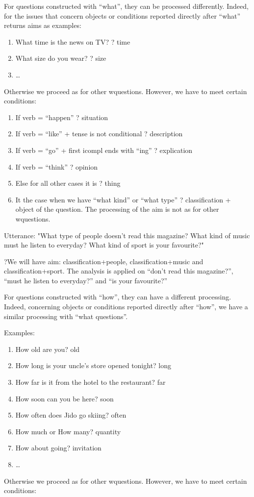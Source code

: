 \documentclass[twoside,a4paper,10pt]{report}
\newcommand{\dokuitem}{\item}
\begin{document}
For questions constructed with “what”, they can be processed differently. Indeed, for the issues that concern objects or conditions reported directly after “what” returns aims as examples:


\begin{enumerate}\dokuitem  What time is the news on TV? ? time
\dokuitem  What size do you wear? ? size
\dokuitem  \ldots{}
\end{enumerate}

Otherwise we proceed as for other w{\textunderscore}questions. However, we have to meet certain conditions:


\begin{enumerate}\dokuitem  If verb = “happen” ? situation
\dokuitem  If verb = “like” + tense is not conditional ? description
\dokuitem  If verb = “go” + first i{\textunderscore}compl ends with “ing” ? explication
\dokuitem  If verb = “think” ? opinion
\dokuitem  Else for all other cases it is ? thing
\dokuitem  It the case when we have “what kind” or “what type” ? classification + object of the question. The processing of the aim is not as for other w{\textunderscore}questions.
\end{enumerate}

Utterance: "What type of people doesn’t read this magazine? What kind of music must he listen to everyday? What kind of sport is your favourite?"



\small
\begin{verbatimtab}
  ?We will have aim: classification+people, classification+music and classification+sport. The
analysis is applied on “don't read this magazine?”, “must he listen to everyday?” and “is
your favourite?”
\end{verbatimtab}
\normalsize
For questions constructed with “how”, they can have a different processing. Indeed, concerning objects or conditions reported directly after “how”, we have a similar processing with “what questions”. 

Examples:


\begin{enumerate}\dokuitem  How old are you? old
\dokuitem  How long is your uncle's store opened tonight? long
\dokuitem  How far is it from the hotel to the restaurant? far 
\dokuitem  How soon can you be here? soon
\dokuitem  How often does Jido go skiing? often
\dokuitem  How much or How many? quantity
\dokuitem  How about going? invitation
\dokuitem  \ldots{}
\end{enumerate}
Otherwise we proceed as for other w{\textunderscore}questions. However, we have to meet certain conditions:
\end{document}

